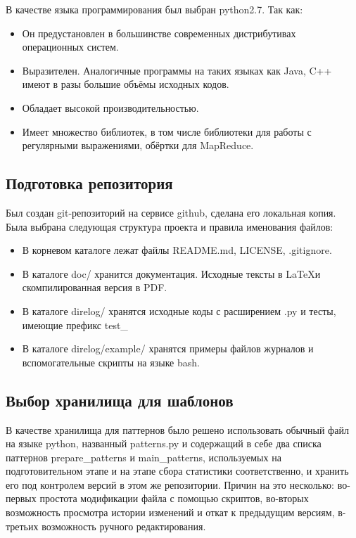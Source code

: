 В качестве языка программирования был выбран python2.7. Так как:

\begin{itemize}
\item Он предустановлен в большинстве современных дистрибутивах
  операционных систем.
\item Выразителен. Аналогичные программы на таких языках как Java, C++
  имеют в разы большие объёмы исходных кодов.
\item Обладает высокой производительностью.
\item Имеет множество библиотек, в том числе библиотеки для работы с
  регулярными выражениями, обёртки для MapReduce.

\end{itemize}


\subsection{Подготовка репозитория}
Был создан git-репозиторий на сервисе github, сделана его локальная копия.
Была выбрана следующая структура проекта и правила именования файлов:

\begin{itemize}
\item В корневом каталоге лежат файлы README.md, LICENSE, .gitignore.
\item В каталоге doc/ хранится документация. Исходные тексты в \LaTeX и
  скомпилированная версия в PDF.
\item В каталоге direlog/ хранятся исходные коды с расширением .py и тесты,
  имеющие префикс test\_
\item В каталоге direlog/example/ хранятся примеры файлов журналов и
  вспомогательные скрипты на языке bash.
\end{itemize}

\subsection{Выбор хранилища для шаблонов}
В качестве хранилища для паттернов было решено использовать обычный файл на
языке python, названный patterns.py и содержащий в себе два списка паттернов
prepare\_patterns и main\_patterns, используемых на подготовительном этапе
и на этапе сбора статистики соответственно,
и хранить его под контролем версий в этом же репозитории. Причин
на это несколько: во-первых простота модификации файла с помощью скриптов,
во-вторых возможность просмотра истории изменений и откат к предыдущим версиям,
в-третьих возможность ручного редактирования.


